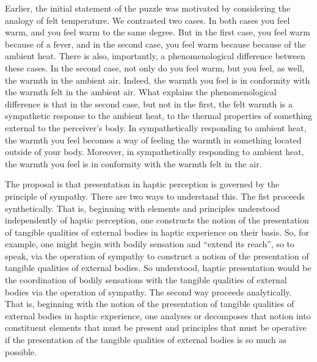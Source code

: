 Earlier, the initial statement of the puzzle was motivated by considering the analogy of felt temperature. We contrasted two cases. In both cases you feel warm, and you feel warm to the same degree. But in the first case, you feel warm because of a fever, and in the second case, you feel warm because because of the ambient heat. There is also, importantly, a phenomenological difference between these cases. In the second case, not only do you feel warm, but you feel, as well, the warmth in the ambient air. Indeed, the warmth you feel is in conformity with the warmth felt in the ambient air. What explains the phenomenological difference is that in the second case, but not in the first, the felt warmth is a sympathetic response to the ambient heat, to the thermal properties of something external to the perceiver's body. In sympathetically responding to ambient heat, the warmth you feel becomes a way of feeling the warmth in something located outside of your body. Moreover, in sympathetically responding to ambient heat, the warmth you feel is in conformity with the warmth felt in the air.

The proposal is that presentation in haptic perception is governed by the principle of sympathy. There are two ways to understand this. The fist proceeds synthetically. That is, beginning with elements and principles understood independently of haptic perception, one constructs the notion of the presentation of tangible qualities of external bodies in haptic experience on their basis. So, for example, one might begin with bodily sensation and ``extend its reach'', so to speak, via the operation of sympathy to construct a notion of the presentation of tangible qualities of external bodies. So understood, haptic presentation would be the coordination of bodily sensations with the tangible qualities of external bodies via the operation of sympathy. The second way proceeds analytically. That is, beginning with the notion of the presentation of tangible qualities of external bodies in haptic experience, one analyses or decomposes that notion into constituent elements that must be present and principles that must be operative if the presentation of the tangible qualities of external bodies is so much as possible. 

